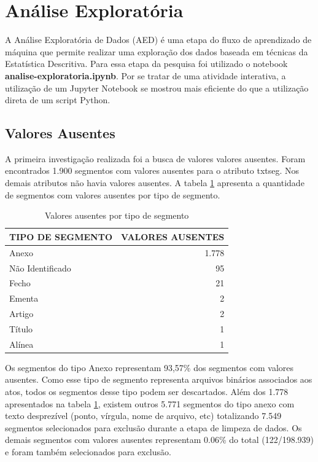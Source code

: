 \section{Análise Exploratória}

A Análise Exploratória de Dados (AED) é uma etapa do fluxo de aprendizado de máquina que permite realizar uma exploração dos dados baseada em técnicas da Estatística Descritiva. Para essa etapa da pesquisa foi utilizado o notebook \textbf{analise-exploratoria.ipynb}. Por se tratar de uma atividade interativa, a utilização de um Jupyter Notebook se mostrou mais eficiente do que a utilização direta de um script Python.

\subsection{Valores Ausentes}

A primeira investigação realizada foi a busca de valores valores ausentes. Foram encontrados 1.900 segmentos com valores ausentes para o atributo txt\textunderscore seg. Nos demais atributos não havia valores ausentes. A tabela \ref{tab:valores-ausentes} apresenta a quantidade de segmentos com valores ausentes por tipo de segmento.

\begin{table}[h!] 
\caption{Valores ausentes por tipo de segmento}
\label{tab:valores-ausentes}
	\begin{center} 
		\begin{tabular}{|l|r|} 
			\hline TIPO DE SEGMENTO & VALORES AUSENTES \\
			\hline
			\hline Anexo & 1.778 \\
			\hline Não Identificado & 95 \\			
			\hline Fecho & 21 \\
			\hline Ementa & 2 \\			
			\hline Artigo & 2 \\
			\hline Título & 1 \\
			\hline Alínea & 1 \\			
			\hline
		\end{tabular}
	\end{center}
	\fdp
\end{table} 

Os segmentos do tipo Anexo representam 93,57\% dos segmentos com valores ausentes. Como esse tipo de segmento representa arquivos binários associados aos atos, todos os segmentos desse tipo podem ser descartados. Além dos 1.778 apresentados na tabela \ref{tab:valores-ausentes}, existem outros 5.771 segmentos do tipo anexo com texto desprezível (ponto, vírgula, nome de arquivo, etc) totalizando 7.549 segmentos selecionados para exclusão durante a etapa de limpeza de dados. Os demais segmentos com valores ausentes representam 0.06\% do total (122/198.939) e foram também selecionados para exclusão.

